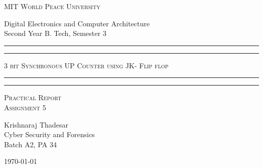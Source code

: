 \documentclass[11pt]{article}
\begin{document}
\begin{titlepage}
	\centering


	\huge\textsc{
		MIT World Peace University
	}\\

	\vspace{0.75\baselineskip} %

	\LARGE{
		Digital Electronics and Computer Architecture\\
		Second Year B. Tech, Semester 3
	}

	\vfill %


	\rule{\textwidth}{1.6pt}\vspace*{-\baselineskip}\vspace*{2pt}
	\rule{\textwidth}{0.6pt}
	\vspace{0.75\baselineskip} %



	\huge{\textsc{
		3 bit Synchronous UP Counter using JK- Flip flop 
		}} \\



	\vspace{0.5\baselineskip} %
	\rule{\textwidth}{0.6pt}\vspace*{-\baselineskip}\vspace*{2.8pt}
	\rule{\textwidth}{1.6pt}

	\vspace{1\baselineskip} %


	\LARGE\textsc{
		Practical Report\\
		Assignment 5
	} %
	\vfill


	\vspace{0.5\baselineskip} %

	\Large{
		Krishnaraj Thadesar \\
		Cyber Security and Forensics\\
		Batch A2, PA 34
	}


	\vspace{0.5\baselineskip} %
	\today

\end{titlepage}
\end{document}

